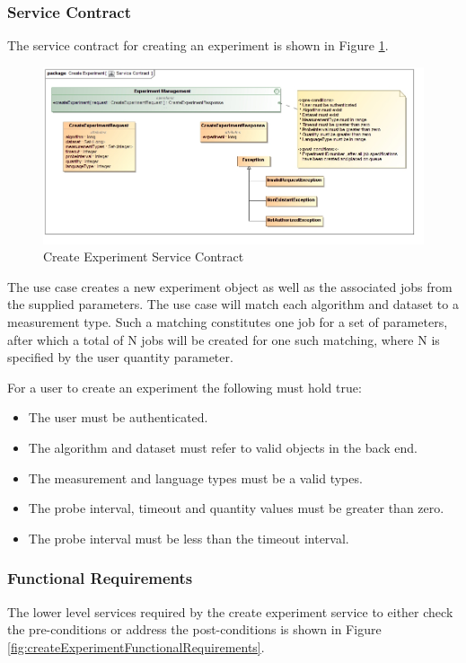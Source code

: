 \subsubsection{Service Contract}
The service contract for creating an experiment is shown in 
Figure \ref{fig:createExperimentServiceContract}.
\begin{figure}[H]
  \begin{center}
  \includegraphics[scale=0.38]{../Diagrams and Charts/Experiment/Create Experiment Service Contract.jpg}
  \caption{Create Experiment Service Contract}
  \label{fig:createExperimentServiceContract}
  \end{center}
\end{figure}

The use case creates a new experiment object as well as the associated jobs from
the supplied parameters. The use case will match each algorithm and dataset to a
measurement type. Such a matching constitutes one job for a set of parameters, 
after which a total of N jobs will be created for one such matching, where N is
specified by the user quantity parameter.

For a user to create an experiment the following must hold true:
\begin{itemize}
  \item The user must be authenticated.
  \item The algorithm and dataset must refer to valid objects in the back end.
  \item The measurement and language types must be a valid types.
  \item The probe interval, timeout and quantity values must be greater than zero.
  \item The probe interval must be less than the timeout interval.
\end{itemize}

\subsubsection {Functional Requirements}
The lower level services required by the create experiment service to 
either check the pre-conditions or address the post-conditions is shown in
Figure \ref{fig:createExperimentFunctionalRequirements}.


